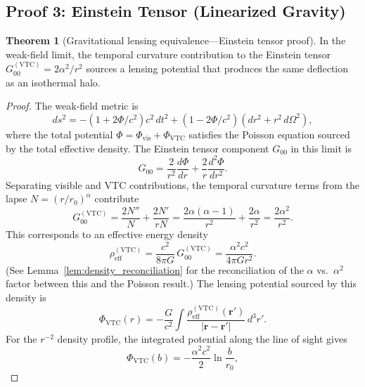 \documentclass[11pt,a4paper]{article}
\theoremstyle{definition}
\newtheorem{theorem}{Theorem}[section]
\newcommand{\vis}{\mathrm{vis}}
\newcommand{\eff}{\mathrm{eff}}
\newcommand{\VTC}{\mathrm{VTC}}
\begin{document}
\subsection{Proof 3: Einstein Tensor (Linearized Gravity)}
\label{sec:thm2_einstein}

\begin{theorem}[Gravitational lensing equivalence---Einstein tensor proof]
In the weak-field limit, the temporal curvature contribution to the Einstein tensor $G_{00}^{(\VTC)} = 2\alpha^2/r^2$ sources a lensing potential that produces the same deflection as an isothermal halo.
\end{theorem}

\begin{proof}
The weak-field metric is
\begin{equation}
ds^2 = -(1+2\Phi/c^2)c^2\,dt^2 + (1-2\Phi/c^2)(dr^2 + r^2\,d\Omega^2),
\end{equation}
where the total potential $\Phi = \Phi_{\vis} + \Phi_{\VTC}$ satisfies the Poisson equation sourced by the total effective density. The Einstein tensor component $G_{00}$ in this limit is
\begin{equation}
G_{00} = \frac{2}{r^2}\frac{d\Phi}{dr} + \frac{2}{r}\frac{d^2\Phi}{dr^2}.
\end{equation}
Separating visible and VTC contributions, the temporal curvature terms from the lapse $N = (r/r_0)^\alpha$ contribute
\begin{equation}
G_{00}^{(\VTC)} = \frac{2N''}{N} + \frac{2N'}{rN} = \frac{2\alpha(\alpha-1)}{r^2} + \frac{2\alpha}{r^2} = \frac{2\alpha^2}{r^2}.
\end{equation}
This corresponds to an effective energy density
\begin{equation}
\rho_{\eff}^{(\VTC)} = \frac{c^2}{8\pi G}\,G_{00}^{(\VTC)} = \frac{\alpha^2 c^2}{4\pi G r^2}.
\end{equation}
(See Lemma~\ref{lem:density_reconciliation} for the reconciliation of the $\alpha$ vs.\ $\alpha^2$ factor between this and the Poisson result.) The lensing potential sourced by this density is
\begin{equation}
\Phi_{\VTC}(r) = -\frac{G}{c^2}\int \frac{\rho_{\eff}^{(\VTC)}(\mathbf{r}')}{|\mathbf{r}-\mathbf{r}'|}\,d^3r'.
\end{equation}
For the $r^{-2}$ density profile, the integrated potential along the line of sight gives
\begin{equation}
\Phi_{\VTC}(b) = -\frac{\alpha^2 c^2}{2}\ln\frac{b}{r_0},
\end{equation}

\end{proof}
\end{document}
